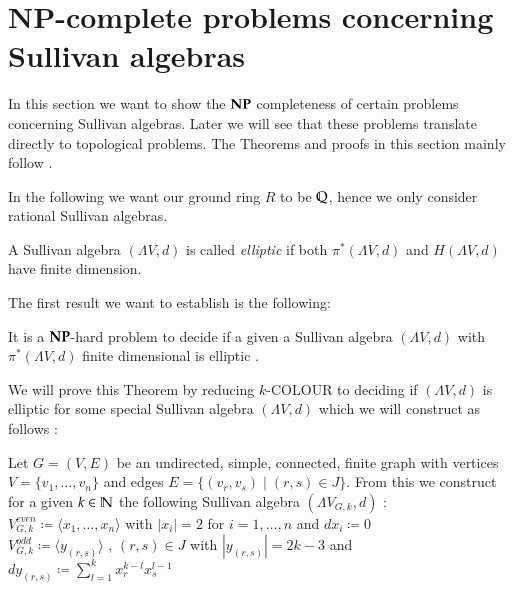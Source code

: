  \section{NP-complete problems concerning Sullivan algebras}
 
 In this section we want to show the 
 $\mathbf{NP}$ completeness of certain problems concerning Sullivan algebras. Later we will see that these problems
 translate directly to topological problems. The Theorems and proofs in this section mainly follow  \cite{Lechuga2000}.
 
 In the following we want our ground ring $R$ to be  $\mathbb{Q}$, hence we only consider rational Sullivan algebras.
 
 \begin{Definition}
  A Sullivan algebra $(\Lambda V, d)$ is called \emph{elliptic} if both $\pi^*(\Lambda V,d)$ and $H(\Lambda V,d)$ have
  finite dimension.
 \end{Definition}
 
 The first result we want to establish is the following:
 
 \begin{Theorem}
 \label{cohomologyFinTheorem}
  It is a $\mathbf{NP}$-hard problem to decide if a given a Sullivan algebra $(\Lambda V,d)$ with $\pi^*(\Lambda V,d)$ finite dimensional 
  is elliptic . 
 \end{Theorem}
 
 
 We will prove this Theorem by reducing $k$-COLOUR to deciding if $(\Lambda V,d)$ is elliptic for some special 
 Sullivan algebra $(\Lambda V,d)$ which we will construct as follows : \\
 
 \begin{Construction}
 \label{constructionOfSullivanAlgebra}
 Let $G = (V,E)$ be an undirected, simple, connected, finite graph with vertices $ V = \lbrace v_1, \dotsc , v_n \rbrace $
 and edges $ E = \lbrace (v_r, v_s) \; | \; (r,s) \in J \rbrace$. From this we construct for a given $k \in \mathbb{N}$ the following
 Sullivan algebra $(\Lambda V_{G,k} , d)$ : \\
 
 $ V^{even}_{G,k} \coloneqq \langle x_1, \dotsc , x_n \rangle $ \; with \; $|x_i| = 2$ \; for \; $ i = 1, \dotsc , n$ \; 
 and \; $dx_i \coloneqq 0$ \\
 
 $V^{odd}_{G,k} \coloneqq \langle y_{(r,s)} \rangle$ , $(r,s) \in J$ \; with \; $|y_{(r,s)}| = 2k - 3$ \; and \; $dy_{(r,s)} \coloneqq 
 \sum_{l = 1}^k x_r^{k -l} x_s^{l - 1}$ \\
 
 \end{Construction}

